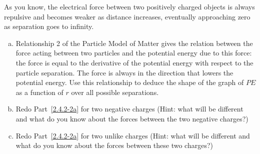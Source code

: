 \label{fnt2.4.2-2}

As you know, the electrical force between two positively charged objects is always repulsive and becomes weaker as distance increases, eventually approaching zero as separation goes to infinity.

\begin{enumerate}[(a)]
	\item Relationship 2 of the Particle Model of Matter gives the relation between the force acting between two particles and the potential energy due to this force: the force is equal to the derivative of the potential energy with respect to the particle separation. The force is always in the direction that lowers the potential energy.  Use this relationship to deduce the shape of the graph of $PE$ as a function of $r$ over all possible separations.
	\label{2.4.2-2a}
	
	\item Redo Part~\eqref{2.4.2-2a} for two negative charges (Hint: what will be different and what do you know about the forces between the two negative charges?)
	
	\item Redo Part~\eqref{2.4.2-2a} for two unlike charges (Hint: what will be different and what do you know about the forces between these two charges?)
\end{enumerate}
